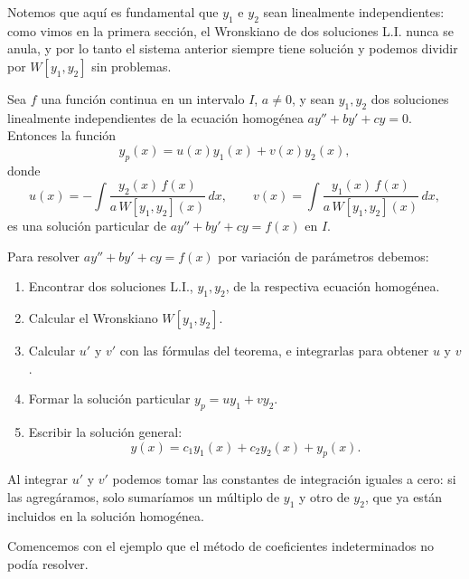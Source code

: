 Notemos que aqu\'i es fundamental que $y_1$ e $y_2$ sean linealmente independientes: como vimos en la primera secci\'on, el Wronskiano de dos soluciones L.I. nunca se anula, y por lo tanto el sistema anterior siempre tiene soluci\'on y podemos dividir por $W[y_1,y_2]$ sin problemas.

\begin{theorem}
    Sea $f$ una funci\'on continua en un intervalo $I$, $a\neq 0$, y sean $y_1,y_2$ dos soluciones linealmente independientes de la ecuaci\'on homog\'enea $ay''+by'+cy=0$. Entonces la funci\'on
    \[
    y_p(x)=u(x)y_1(x)+v(x)y_2(x),
    \]
    donde
    \[
    u(x)=-\int \dfrac{y_2(x)\,f(x)}{a\,W[y_1,y_2](x)}\,dx,\qquad v(x)=\int \dfrac{y_1(x)\,f(x)}{a\,W[y_1,y_2](x)}\,dx,
    \]
    es una soluci\'on particular de $ay''+by'+cy=f(x)$ en $I$.
\end{theorem}

\begin{remark}[Procedimiento]
    Para resolver $ay''+by'+cy=f(x)$ por variaci\'on de par\'ametros debemos:
    \begin{enumerate}[label=\roman*)]
        \item Encontrar dos soluciones L.I., $y_1,y_2$, de la respectiva ecuaci\'on homog\'enea.
        \item Calcular el Wronskiano $W[y_1,y_2]$.
        \item Calcular $u'$ y $v'$ con las f\'ormulas del teorema, e integrarlas para obtener $u$ y $v$.
        \item Formar la soluci\'on particular $y_p=uy_1+vy_2$.
        \item Escribir la soluci\'on general:
        \[
        y(x)=c_1y_1(x)+c_2y_2(x)+y_p(x).
        \]
    \end{enumerate}
    Al integrar $u'$ y $v'$ podemos tomar las constantes de integraci\'on iguales a cero: si las agreg\'aramos, solo sumar\'iamos un m\'ultiplo de $y_1$ y otro de $y_2$, que ya est\'an incluidos en la soluci\'on homog\'enea.
\end{remark}

Comencemos con el ejemplo que el m\'etodo de coeficientes indeterminados no pod\'ia resolver.

